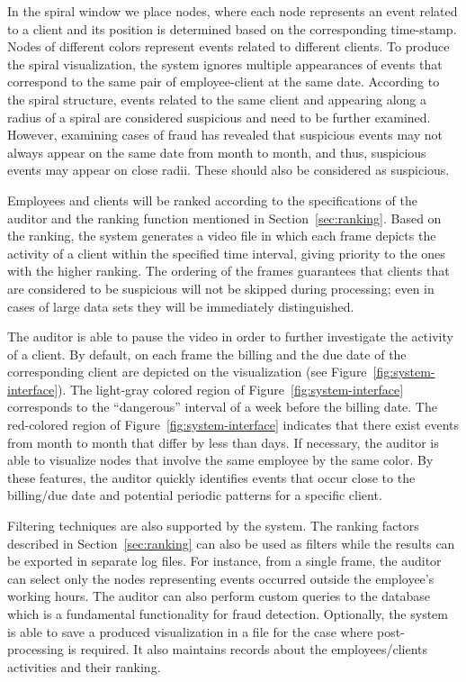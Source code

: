 \documentclass[conference]{IEEEtran}
\begin{document}
In the spiral window we place nodes, where each node represents an
event related to a client and its position is determined based on
the corresponding time-stamp. Nodes of different colors represent
events related to different clients. To produce the spiral
visualization, the system ignores multiple appearances of events
that correspond to the same pair of employee-client at the same
date. According to the spiral structure, events related to the same
client and appearing along a radius of a spiral are considered
suspicious and need to be further examined. However, examining cases
of fraud has revealed that suspicious events may not always appear
on the same date from month to month, and thus, suspicious events
may appear on close radii. These should also be considered as
suspicious.

Employees and clients will be ranked according to the specifications
of the auditor and the ranking function mentioned in
Section~\ref{sec:ranking}. Based on the ranking, the system
generates a video file in which each frame depicts the activity of a
client within the specified time interval, giving priority to the
ones with the higher ranking.  The ordering of the frames guarantees
that clients that are considered to be suspicious will not be
skipped during processing; even in cases of large data sets they
will be immediately distinguished.

The auditor is able to pause the video in order to further
investigate the activity of a client. By default, on each frame the
billing and the due date of the corresponding client are depicted on
the visualization (see Figure~\ref{fig:system-interface}). The
light-gray colored region of Figure~\ref{fig:system-interface}
corresponds to the ``dangerous'' interval of a week before the
billing date. The red-colored region of
Figure~\ref{fig:system-interface} indicates that there exist events
from month to month that differ by less than  days. If necessary,
the auditor is able to visualize nodes that involve the same
employee by the same color. By these features, the auditor quickly
identifies events that occur close to the billing/due date and
potential periodic patterns for a specific client.

Filtering techniques are also supported by the system. The ranking
factors described in Section~\ref{sec:ranking} can also be used as
filters while the results can be exported in separate log files. For
instance, from a single frame, the auditor can select only the nodes
representing events occurred outside the employee's working hours.
The auditor can also perform custom queries to the database which is
a fundamental functionality for fraud detection. Optionally, the
system is able to save a produced visualization in a file for the
case where post-processing is required. It also maintains records
about the employees/clients activities and their ranking.
\end{document}
